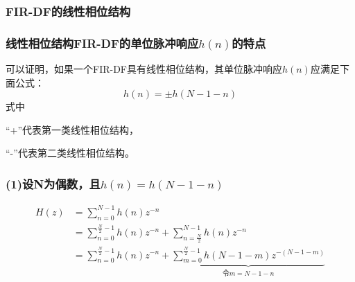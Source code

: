 \documentclass[notheorems,compress,mathserif,table]{beamer}
\begin{document}
\subsubsection{FIR-DF的线性相位结构}
\begin{frame}\frametitle{线性相位结构FIR-DF的单位脉冲响应$h(n)$的特点}%
可以证明，如果一个FIR-DF具有线性相位结构，其单位脉冲响应$h(n)$应满足下面公式：
$$h(n)=\pm h(N-1-n)$$
式中
\par “+”代表第一类线性相位结构，
\par “-”代表第二类线性相位结构。
\end{frame}
\begin{frame}\frametitle{(1)设N为偶数，且$h(n)= h(N-1-n)$}%
    \begin{equation*}
        \begin{split}
        H(z) &= \sum_{n=0}^{N-1}h(n)z^{-n}\\
             &= \sum_{n=0}^{\frac{N}{2}-1}h(n)z^{-n}+ \sum_{n=\frac{N}{2}}^{N-1}h(n)z^{-n}\\
             &= \sum_{n=0}^{\frac{N}{2}-1}h(n)z^{-n}+\underbrace{
                \sum_{m=0}^{\frac{N}{2}-1}h(N-1-m)z^{-(N-1-m)}}_{\mbox{令$m=N-1-n$}}\\
        \end{split}
    \end{equation*}
\end{frame}
\end{document}
